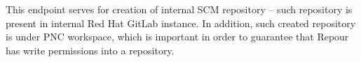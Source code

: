 \documentclass[../main.tex]{subfiles}
\begin{document}
This endpoint serves for creation of internal SCM repository – such repository is present in internal Red Hat GitLab instance. In addition, such created repository is under PNC workspace, which is important in order to guarantee that Repour has write permissions into a repository.
\end{document}
